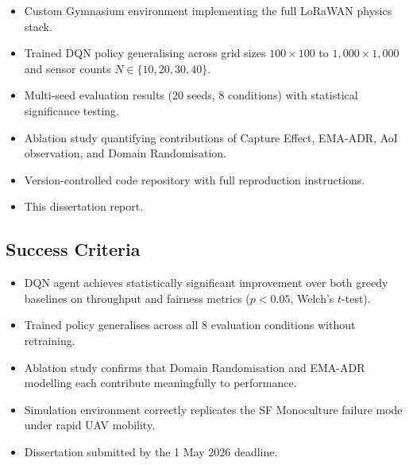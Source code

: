 \begin{itemize}
    \item Custom Gymnasium environment implementing the full LoRaWAN physics stack.
    \item Trained DQN policy generalising across grid sizes $100\times100$ to $1{,}000\times1{,}000$ and sensor counts $N \in \{10, 20, 30, 40\}$.
    \item Multi-seed evaluation results (20 seeds, 8 conditions) with statistical significance testing.
    \item Ablation study quantifying contributions of Capture Effect, EMA-ADR, AoI observation, and Domain Randomisation.
    \item Version-controlled code repository with full reproduction instructions.
    \item This dissertation report.
\end{itemize}

\subsection*{Success Criteria}

\begin{itemize}
    \item DQN agent achieves statistically significant improvement over both greedy baselines on throughput and fairness metrics ($p < 0.05$, Welch's $t$-test).
    \item Trained policy generalises across all 8 evaluation conditions without retraining.
    \item Ablation study confirms that Domain Randomisation and EMA-ADR modelling each contribute meaningfully to performance.
    \item Simulation environment correctly replicates the SF Monoculture failure mode under rapid UAV mobility.
    \item Dissertation submitted by the 1 May 2026 deadline.
\end{itemize}
